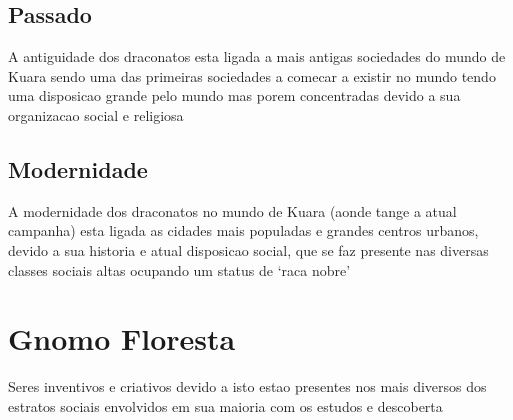 \documentclass{book}
\begin{document}
\section{Passado}
A antiguidade dos draconatos esta ligada a mais antigas sociedades do mundo de Kuara sendo 
uma das primeiras sociedades a comecar a existir no mundo tendo uma disposicao grande pelo 
mundo mas porem concentradas devido a sua organizacao social e religiosa
\section{Modernidade}
A modernidade dos draconatos no mundo de Kuara (aonde tange a atual campanha) esta ligada 
as cidades mais populadas e grandes centros urbanos, devido a sua historia e atual disposicao
social, que se faz presente nas diversas classes sociais altas ocupando um status de `raca 
nobre'

\chapter{Gnomo Floresta}
Seres inventivos e criativos devido a isto estao presentes nos mais diversos dos estratos 
sociais envolvidos em sua maioria com os estudos e descoberta
\end{document}
